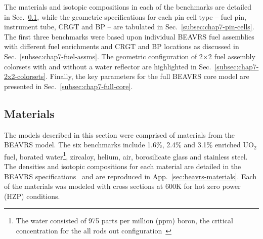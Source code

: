 
The materials and isotopic compositions in each of the benchmarks are detailed in Sec.~\ref{subsec:chap7-materials}, while the geometric specifications for each pin cell type -- fuel pin, instrument tube, \ac{CRGT} and \ac{BP} -- are tabulated in Sec.~\ref{subsec:chap7-pin-cells}. The first three benchmarks were based upon individual \ac{BEAVRS} fuel assemblies with different fuel enrichments and \ac{CRGT} and \ac{BP} locations as discussed in Sec.~\ref{subsec:chap7-fuel-assms}. The geometric configuration of 2$\times$2 fuel assembly colorsets with and without a water reflector are highlighted in Sec.~\ref{subsec:chap7-2x2-colorsets}. Finally, the key parameters for the full \ac{BEAVRS} core model are presented in Sec.~\ref{subsec:chap7-full-core}.


\subsection{Materials}
\label{subsec:chap7-materials}

The models described in this section were comprised of materials from the \ac{BEAVRS} model. The six benchmarks include 1.6\%, 2.4\% and 3.1\% enriched UO$_2$ fuel, borated water\footnote{The water consisted of 975 parts per million (ppm) boron, the critical concentration for the all rods out configuration~\cite{horelik2013beavrs}}, zircaloy, helium, air, borosilicate glass and stainless steel. The densities and isotopic compositions for each material are detailed in the \ac{BEAVRS} specifications~\cite{horelik2013beavrs} and are reproduced in App.~\ref{sec:beavrs-materials}. Each of the materials was modeled with cross sections at 600K for hot zero power (HZP) conditions.



